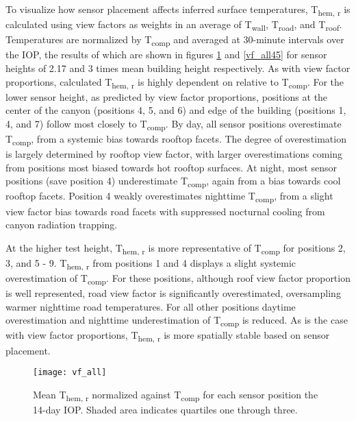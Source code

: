 To visualize how sensor placement affects inferred surface temperatures, T\textsubscript{hem, r} is calculated using view factors as weights in an average of T\textsubscript{wall}, T\textsubscript{road}, and T\textsubscript{roof}. Temperatures are normalized by T\textsubscript{comp} and averaged at 30-minute intervals over the IOP, the results of which are shown in figures \ref{vf_all} and \ref{vf_all45} for sensor heights of 2.17 and 3 times mean building height respectively. As with view factor proportions, calculated T\textsubscript{hem, r} is highly dependent on relative to T\textsubscript{comp}. For the lower sensor height, as predicted by view factor proportions, positions at the center of the canyon (positions 4, 5, and 6) and edge of the building (positions 1, 4, and 7) follow most closely to T\textsubscript{comp}. By day, all sensor positions overestimate T\textsubscript{comp}, from a systemic bias towards rooftop facets. The degree of overestimation is largely determined by rooftop view factor, with larger overestimations coming from positions most biased towards hot rooftop surfaces. At night, most sensor positions (save position 4) underestimate T\textsubscript{comp}, again from a bias towards cool rooftop facets. Position 4 weakly overestimates nighttime T\textsubscript{comp}, from a slight view factor bias towards road facets with suppressed nocturnal cooling from canyon radiation trapping. 

At the higher test height, T\textsubscript{hem, r} is more representative of T\textsubscript{comp} for positions 2, 3, and 5 - 9. T\textsubscript{hem, r} from positions 1 and 4 displays a slight systemic overestimation of T\textsubscript{comp}. For these positions, although roof view factor proportion is well represented, road view factor is significantly overestimated, oversampling warmer nighttime road temperatures. For all other positions daytime overestimation and nighttime underestimation of T\textsubscript{comp} is reduced. As is the case with view factor proportions, T\textsubscript{hem, r} is more spatially stable based on sensor placement.
 
   \begin{figure}[H]
 	\centering
 	\texttt{[image: vf\_all]}
 	\caption{Mean T\textsubscript{hem, r} normalized against T\textsubscript{comp} for each sensor position the 14-day IOP. Shaded area indicates quartiles one through three.}
 	\label{vf_all}
 \end{figure}

